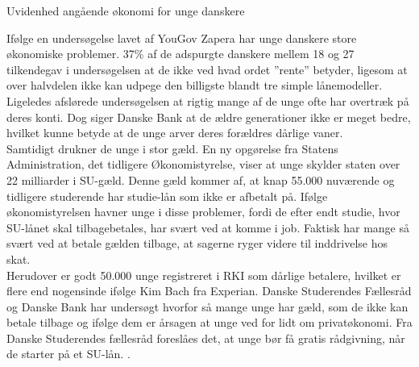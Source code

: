 Uvidenhed angående økonomi for unge danskere

Ifølge en undersøgelse lavet af YouGov Zapera \cite{DanskeB1} har unge danskere store økonomiske problemer. 37\% af de adspurgte danskere mellem 18 og 27 tilkendegav i undersøgelsen at de ikke ved hvad ordet ”rente” betyder, ligesom at over halvdelen ikke kan udpege den billigste blandt tre simple lånemodeller. Ligeledes afslørede undersøgelsen at rigtig mange af de unge ofte har overtræk på deres konti. Dog siger Danske Bank at de ældre generationer ikke er meget bedre, hvilket kunne betyde at de unge arver deres forældres dårlige vaner.  
\\
Samtidigt drukner de unge i stor gæld. En ny opgørelse fra Statens Administration, det tidligere Økonomistyrelse, viser at unge skylder staten over 22 milliarder i SU-gæld. Denne gæld kommer af, at knap 55.000\cite{dr.dk} nuværende og tidligere studerende har studie-lån som ikke er afbetalt på. Ifølge økonomistyrelsen havner unge i disse problemer, fordi de efter endt studie, hvor SU-lånet skal tilbagebetales, har svært ved at komme i job\cite{jobindex}. Faktisk har mange så svært ved at betale gælden tilbage, at sagerne ryger videre til inddrivelse hos skat\cite{BusinessDK1}.
\\
Herudover er godt 50.000 unge registreret i RKI som dårlige betalere, hvilket er flere end nogensinde ifølge Kim Bach fra Experian. Danske Studerendes Fællesråd og Danske Bank har undersøgt hvorfor så mange unge har gæld, som de ikke kan betale tilbage og ifølge dem er årsagen at unge ved for lidt om privatøkonomi. Fra Danske Studerendes fællesråd foreslåes det, at unge bør få gratis rådgivning, når de starter på et SU-lån. \cite{dr.dk}.
